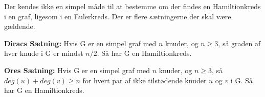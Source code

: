 Der kendes ikke en simpel måde til at bestemme om der findes en Hamiltionkreds i en graf, ligesom i en Eulerkreds. Der er flere sætningerne der skal være gældende.

\begin{thm} \label{diracs_thm}
\textbf{Diracs Sætning:} 
Hvis G er en simpel graf med $n$ knuder, og $n\geq3$, så graden af hver knude i G er mindst $n/2$. 
Så har G en Hamiltionkreds.  
\end{thm}

\begin{thm} \label{diracs_thm}
\textbf{Ores Sætning:} 
Hvis G er en simpel graf med $n$ knuder, og $n\geq3$, så\\ $deg(u)+deg(v)\geq n$ for hvert par af ikke tilstødende knuder $u$ og $v$ i G. 
Så har G en Hamiltionkreds. 
\end{thm}

